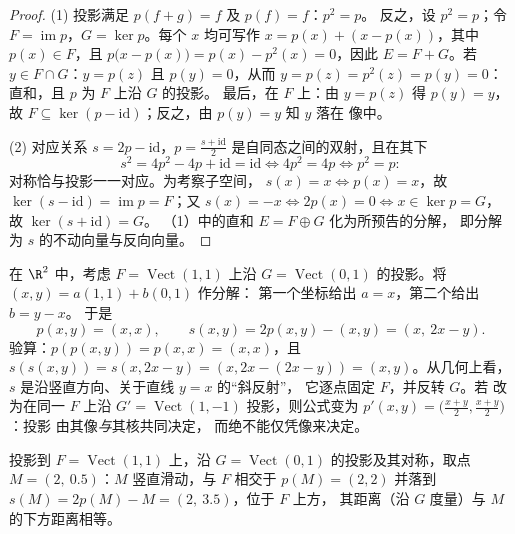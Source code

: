 \begin{proof}
(1) 投影满足 $p(f + g) = f$ 及 $p(f) = f$：$p^2 = p$。
反之，设 $p^2 = p$；令 $F = \operatorname{im} p$，$G = \ker
p$。每个 $x$ 均可写作 $x = p(x) + (x - p(x))$，其中 $p(x) \in F$，且
$p\bigl(x - p(x)\bigr) = p(x) - p^2(x) = 0$，因此 $E = F + G$。若 $y \in
F \cap G$：$y = p(z)$ 且 $p(y) = 0$，从而 $y = p(z) = p^2(z) = p(y) =
0$：直和，且 $p$ 为 $F$ 上沿 $G$ 的投影。
最后，在 $F$ 上：由 $y = p(z)$ 得 $p(y) = y$，故 $F \subseteq
\ker(p - \mathrm{id})$；反之，由 $p(y) = y$ 知 $y$ 落在
像中。

(2) 对应关系 $s = 2p - \mathrm{id}$，$p = \frac{s +
\mathrm{id}}2$ 是自同态之间的双射，且在其下
\[
s^2 = 4p^2 - 4p + \mathrm{id} = \mathrm{id}
\iff 4p^2 = 4p \iff p^2 = p :
\]
对称恰与投影一一对应。为考察子空间，
$s(x) = x \iff p(x) = x$，故 $\ker(s - \mathrm{id}) =
\operatorname{im} p = F$；又 $s(x) = -x \iff 2p(x) = 0 \iff x
\in \ker p = G$，故 $\ker(s + \mathrm{id}) = G$。
（1）中的直和 $E = F \oplus G$ 化为所预告的分解，
即分解为 $s$ 的不动向量与反向向量。
\end{proof}

\begin{example}[投影及其对称的显式计算]
\label{ex:b1:linmaps:projexplicit}
在 $\R^2$ 中，考虑 $F = \operatorname{Vect}(1,1)$ 上沿 $G =
\operatorname{Vect}(0,1)$ 的投影。将 $(x, y) = a(1,1) + b(0,1)$ 作分解：
第一个坐标给出 $a = x$，第二个给出 $b = y - x$。
于是
\[
p(x, y) = (x, x),
\qquad
s(x, y) = 2p(x,y) - (x,y) = (x,\ 2x - y).
\]
验算：$p(p(x,y)) = p(x,x) = (x,x)$，且 $s(s(x,y)) =
s(x, 2x - y) = (x, 2x - (2x - y)) = (x, y)$。从几何上看，$s$
是沿竖直方向、关于直线 $y = x$ 的“斜反射”，
它逐点固定 $F$，并反转 $G$。若
改为在同一 $F$ 上沿 $G' =
\operatorname{Vect}(1,-1)$ 投影，则公式变为
$p'(x,y) = \bigl(\frac{x+y}2, \frac{x+y}2\bigr)$：投影
由其像\emph{与}其核共同决定，
而绝不能仅凭像来决定。
\end{example}

\begin{omfigure}

{\small 投影到 $F = \operatorname{Vect}(1,1)$ 上，沿
$G = \operatorname{Vect}(0,1)$ 的投影及其对称，取点 $M
= (2,\ 0.5)$：$M$ 竖直滑动，与 $F$ 相交于 $p(M) = (2,2)$
并落到 $s(M) = 2p(M) - M = (2,\ 3.5)$，位于 $F$ 上方，
其距离（沿 $G$ 度量）与 $M$ 的下方距离相等。}
\end{omfigure}

